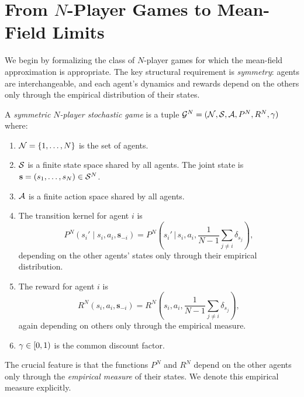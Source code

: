 \documentclass[11pt,a4paper]{article}
\begin{document}
\section{From $N$-Player Games to Mean-Field Limits}
\label{sec:n-player-to-mf}

We begin by formalizing the class of $N$-player games for which the
mean-field approximation is appropriate.  The key structural
requirement is \emph{symmetry}: agents are interchangeable, and
each agent's dynamics and rewards depend on the others only through
the empirical distribution of their states.

\begin{definition}
\label{def:symmetric-game}
A \emph{symmetric $N$-player stochastic game} is a tuple
$\mathcal{G}^N = (\mathcal{N}, \mathcal{S}, \mathcal{A}, P^N, R^N, \gamma)$
where:
\begin{enumerate}[nosep]
  \item $\mathcal{N} = \{1, \ldots, N\}$ is the set of agents.
  \item $\mathcal{S}$ is a finite state space shared by all agents.
        The joint state is $\mathbf{s} = (s_1, \ldots, s_N)
        \in \mathcal{S}^N$.
  \item $\mathcal{A}$ is a finite action space shared by all agents.
  \item The transition kernel for agent $i$ is
    \[
      P^N(s_i' \mid s_i, a_i, \mathbf{s}_{-i})
      = P^N\!\left(s_i' \,\Big|\, s_i, a_i,
        \frac{1}{N-1}\sum_{j \neq i} \delta_{s_j}\right),
    \]
    depending on the other agents' states only through their
    empirical distribution.
  \item The reward for agent $i$ is
    \[
      R^N(s_i, a_i, \mathbf{s}_{-i})
      = R^N\!\left(s_i, a_i,
        \frac{1}{N-1}\sum_{j \neq i} \delta_{s_j}\right),
    \]
    again depending on others only through the empirical measure.
  \item $\gamma \in [0,1)$ is the common discount factor.
\end{enumerate}
\end{definition}

The crucial feature is that the functions $P^N$ and $R^N$ depend on
the other agents only through the \emph{empirical measure} of their
states.  We denote this empirical measure explicitly.
\end{document}
